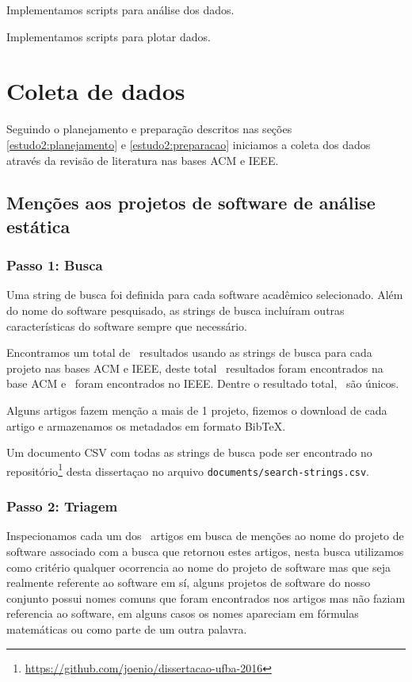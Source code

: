 

Implementamos scripts para análise dos dados.

Implementamos scripts para plotar dados.


\section{Coleta de dados}

Seguindo o planejamento e preparação descritos nas seções
\ref{estudo2:planejamento} e \ref{estudo2:preparacao} iniciamos a coleta dos
dados através da revisão de literatura nas bases ACM e IEEE.

\subsection{Menções aos projetos de software de análise estática}



\subsubsection{Passo 1: Busca}

Uma string de busca foi definida para cada software acadêmico selecionado.
Além do nome do software pesquisado, as strings de busca incluíram outras
características do software sempre que necessário.

Encontramos um total de \SearchCount \ resultados usando as strings de busca
para cada projeto nas bases ACM e IEEE, deste total \SearchACMCount \ resultados
foram encontrados na base ACM e \SearchIEEECount \ foram encontrados
no IEEE. Dentre o resultado total, \SearchUniqueCount \ são únicos.

Alguns artigos fazem menção a mais de 1 projeto, fizemos o download de cada
artigo e armazenamos os metadados em formato BibTeX.

Um documento CSV com todas as strings de busca pode ser encontrado no
repositório\footnote{\url{https://github.com/joenio/dissertacao-ufba-2016}}
desta dissertaçao no arquivo \texttt{documents/search-strings.csv}.

\subsubsection{Passo 2: Triagem}

Inspecionamos cada um dos \SearchUniqueCount \ artigos em busca de menções ao
nome do projeto de software associado com a busca que retornou estes artigos,
nesta busca utilizamos como critério qualquer ocorrencia ao nome do projeto de
software mas que seja realmente referente ao software em sí, alguns projetos de
software do nosso conjunto possui nomes comuns que foram encontrados nos
artigos mas não faziam referencia ao software, em alguns casos os nomes
apareciam em fórmulas matemáticas ou como parte de um outra palavra.

